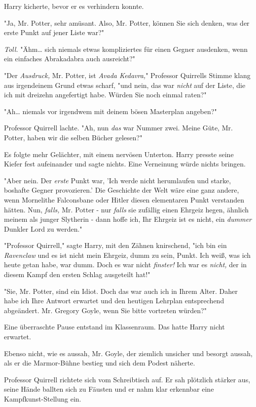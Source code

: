{Harry kicherte, bevor er es verhindern konnte.

"Ja, Mr. Potter, sehr amüsant. Also, Mr. Potter, können Sie sich denken, was der erste Punkt auf jener Liste war?"

\emph{Toll.} "Ähm… sich niemals etwas kompliziertes für einen Gegner ausdenken, wenn ein einfaches Abrakadabra auch ausreicht?"

"Der \emph{Ausdruck,} Mr. Potter, ist \emph{Avada Kedavra,}" Professor Quirrells Stimme klang aus irgendeinem Grund etwas scharf, "und nein, das war \emph{nicht} auf der Liste, die ich mit dreizehn angefertigt habe. Würden Sie noch einmal raten?"

"Ah… niemals vor irgendwem mit deinem bösen Masterplan angeben?"

Professor Quirrell lachte. "Ah, nun \emph{das} war Nummer zwei. Meine Güte, Mr. Potter, haben wir die selben Bücher gelesen?"

Es folgte mehr Gelächter, mit einem nervösen Unterton. Harry presste seine Kiefer fest aufeinander und sagte nichts. Eine Verneinung würde nichts bringen.

"Aber nein. Der \emph{erste} Punkt war, 'Ich werde nicht herumlaufen und starke, boshafte Gegner provozieren.' Die Geschichte der Welt wäre eine ganz andere, wenn Mornelithe Falconsbane oder Hitler diesen elementaren Punkt verstanden hätten. Nun, \emph{falls,} Mr. Potter - nur \emph{falls} sie zufällig einen Ehrgeiz hegen, ähnlich meinem als junger Slytherin - dann hoffe ich, Ihr Ehrgeiz ist es nicht, ein \emph{dummer} Dunkler Lord zu werden."

"Professor Quirrell," sagte Harry, mit den Zähnen knirschend, "ich bin ein \emph{Ravenclaw} und es ist nicht mein Ehrgeiz, dumm zu sein, Punkt. Ich weiß, was ich heute getan habe, war dumm. Doch es war nicht \emph{finster!} Ich war es \emph{nicht,} der in diesem Kampf den ersten Schlag ausgeteilt hat!"

"Sie, Mr. Potter, sind ein Idiot. Doch das war auch ich in Ihrem Alter. Daher habe ich Ihre Antwort erwartet und den heutigen Lehrplan entsprechend abgeändert. Mr. Gregory Goyle, wenn Sie bitte vortreten würden?"

Eine überraschte Pause entstand im Klassenraum. Das hatte Harry nicht erwartet.

Ebenso nicht, wie es aussah, Mr. Goyle, der ziemlich unsicher und besorgt aussah, als er die Marmor-Bühne bestieg und sich dem Podest näherte.

Professor Quirrell richtete sich vom Schreibtisch auf. Er sah plötzlich stärker aus, seine Hände ballten sich zu Fäusten und er nahm klar erkennbar eine Kampfkunst-Stellung ein.

}
